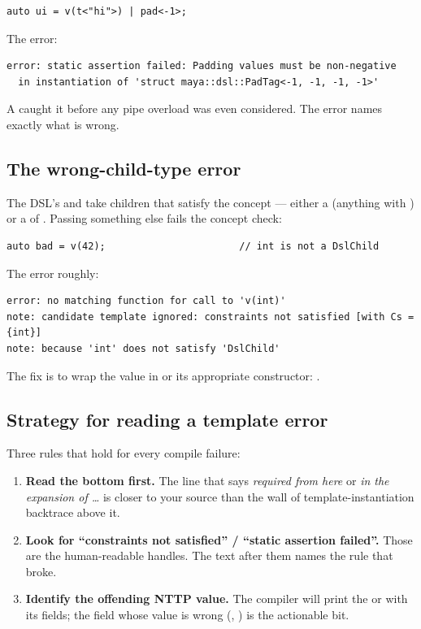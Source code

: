 \begin{lstlisting}
auto ui = v(t<"hi">) | pad<-1>;
\end{lstlisting}

The error:

\begin{lstlisting}[style=shell]
error: static assertion failed: Padding values must be non-negative
  in instantiation of 'struct maya::dsl::PadTag<-1, -1, -1, -1>'
\end{lstlisting}

A  caught it before any pipe overload was
even considered. The error names exactly what is wrong.

\subsection{The wrong-child-type error}

The DSL's  and  take children that satisfy the
 concept --- either a  (anything with
) or a  of .
Passing something else fails the concept check:

\begin{lstlisting}
auto bad = v(42);                       // int is not a DslChild
\end{lstlisting}

The error roughly:

\begin{lstlisting}[style=shell]
error: no matching function for call to 'v(int)'
note: candidate template ignored: constraints not satisfied [with Cs = {int}]
note: because 'int' does not satisfy 'DslChild'
\end{lstlisting}

The fix is to wrap the value in  or its appropriate
constructor: .

\subsection{Strategy for reading a template error}

Three rules that hold for every \maya{} compile failure:

\begin{enumerate}[leftmargin=*]
  \item \textbf{Read the bottom first.} The line that says
    \emph{required from here} or \emph{in the expansion of \dots}
    is closer to your source than the wall of template-instantiation
    backtrace above it.
  \item \textbf{Look for ``constraints not satisfied'' / ``static
    assertion failed''.} Those are the human-readable handles. The
    text after them names the rule that broke.
  \item \textbf{Identify the offending NTTP value.} The compiler
    will print the  or  with its fields;
    the field whose value is wrong (,
    ) is the actionable bit.
\end{enumerate}

